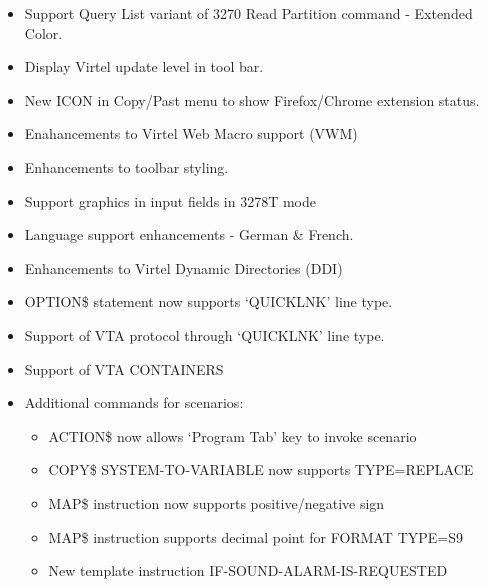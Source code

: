 \documentclass[letterpaper,10pt,english]{sphinxmanual}
\begin{document}
\begin{itemize}
\item {} 
Support Query List variant of 3270 Read Partition command - Extended Color.

\item {} 
Display Virtel update level in tool bar.

\item {} 
New ICON in Copy/Past menu to show Firefox/Chrome extension status.

\item {} 
Enahancements to Virtel Web Macro support (VWM)

\item {} 
Enhancements to toolbar styling.

\item {} 
Support graphics in input fields in 3278T mode

\item {} 
Language support enhancements - German \& French.

\item {} 
Enhancements to Virtel Dynamic Directories (DDI)

\end{itemize}

\begin{itemize}
\item {} 
OPTION\$ statement now supports ‘QUICKLNK’ line type.

\item {} 
Support of VTA protocol through ‘QUICKLNK’ line type.

\item {} 
Support of VTA CONTAINERS

\item {} 
Additional commands for scenarios:
\begin{itemize}
\item {} 
ACTION\$ now allows ‘Program Tab’ key to invoke scenario

\item {} 
COPY\$ SYSTEM-TO-VARIABLE now supports TYPE=REPLACE

\item {} 
MAP\$ instruction now supports positive/negative sign

\item {} 
MAP\$ instruction supports decimal point for FORMAT TYPE=S9

\item {} 
New template instruction IF-SOUND-ALARM-IS-REQUESTED

\end{itemize}

\end{itemize}
\end{document}
